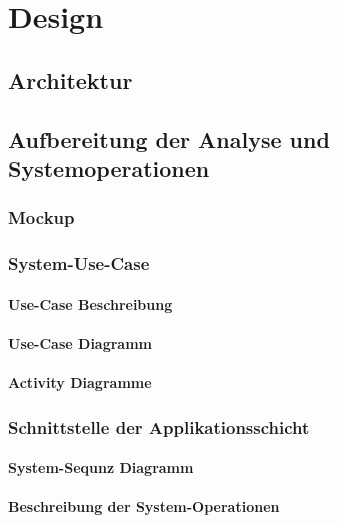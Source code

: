 \chapter{Design}\label{chap:Design}

\section{Architektur}

\section{Aufbereitung der Analyse und Systemoperationen}

\subsection{Mockup}

\subsection{System-Use-Case}

\subsubsection{Use-Case Beschreibung}

\subsubsection{Use-Case Diagramm}

\subsubsection{Activity Diagramme}

\subsection{Schnittstelle der Applikationsschicht}

\subsubsection{System-Sequnz Diagramm}

\subsubsection{Beschreibung der System-Operationen}

